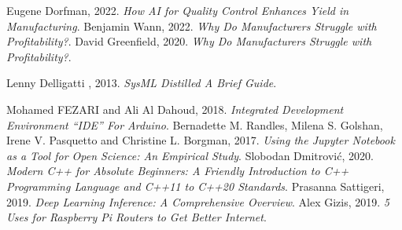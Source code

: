 \begin{thebibliography}{20}
Eugene Dorfman, 2022. \emph{How AI for Quality Control Enhances Yield in Manufacturing}.
Benjamin Wann, 2022. \emph{Why Do Manufacturers Struggle with Profitability?}.
David Greenfield, 2020. \emph{Why Do Manufacturers Struggle with Profitability?}.

Lenny Delligatti , 2013. \emph{SysML Distilled A Brief Guide}.

 Mohamed FEZARI and Ali Al Dahoud, 2018. \emph{Integrated Development Environment “IDE” For Arduino}.
Bernadette M. Randles, Milena S. Golshan, Irene V. Pasquetto and Christine L. Borgman, 2017. \emph{Using the Jupyter Notebook as a Tool for Open Science: An Empirical Study}.
Slobodan Dmitrović, 2020. \emph{ Modern C++ for Absolute Beginners: A Friendly Introduction to C++ Programming Language and C++11 to C++20 Standards}.
Prasanna Sattigeri, 2019. \emph{Deep Learning Inference: A Comprehensive Overview}.
Alex Gizis, 2019. \emph{5 Uses for Raspberry Pi Routers to Get Better Internet}.


\end{thebibliography}
